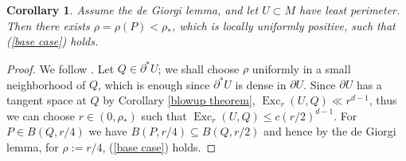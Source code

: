 \documentclass[reqno,11pt]{amsart}
\DeclareMathOperator{\Exc}{Exc}
\newtheorem{corollary}[theorem]{Corollary}
\theoremstyle{definition}
\numberwithin{equation}{section}
\begin{document}
\begin{corollary}\label{DGL base case}
Assume the de Giorgi lemma, and let $U \subset M$ have least perimeter.
Then there exists $\rho = \rho(P) < \rho_*$, which is locally uniformly positive, such that (\ref{base case}) holds.
\end{corollary}
\begin{proof}
We follow \cite[pg109]{Giusti77}.
Let $Q \in \partial^* U$; we shall choose $\rho$ uniformly in a small neighborhood of $Q$, which is enough since $\partial^* U$ is dense in $\partial U$.
Since $\partial U$ has a tangent space at $Q$ by Corollary \ref{blowup theorem}, $\Exc_r(U, Q) \ll r^{d - 1}$, thus we can choose $r \in (0, \rho_*)$ such that $\Exc_r(U, Q) \leq c(r/2)^{d - 1}$.
For $P \in B(Q, r/4)$ we have $B(P, r/4) \subseteq B(Q, r/2)$ and hence by the de Giorgi lemma, for $\rho := r/4$, (\ref{base case}) holds.
\end{proof}
\end{document}
